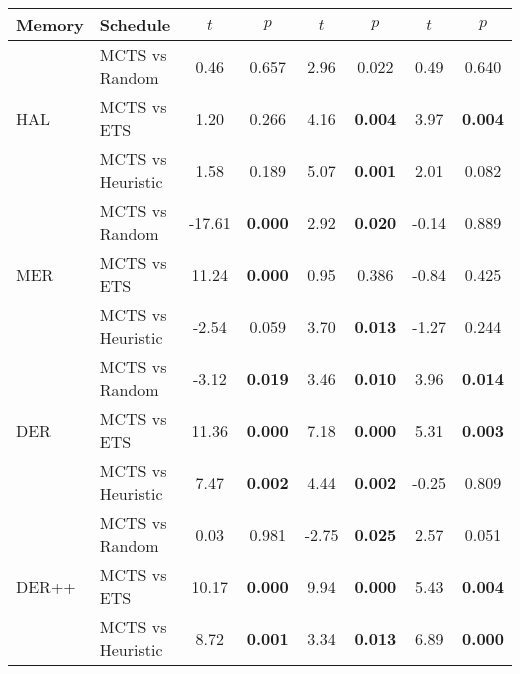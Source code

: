 \begin{tabular}{llcccccc}
\textbf{Memory}        & \textbf{Schedule} & $t$        & $p$          & $t$       & $p$          & $t$       & $p$          \\ \midrule
\multirow{3}{*}{HAL}   & MCTS vs Random    & 0.46   & 0.657 & 2.96  & 0.022 & 0.49  & 0.640 \\
                       & MCTS vs ETS       & 1.20   & 0.266 & 4.16  & \textbf{0.004} & 3.97  & \textbf{0.004} \\
                       & MCTS vs Heuristic   & 1.58   & 0.189 & 5.07  & \textbf{0.001} & 2.01  & 0.082 \\ \midrule
\multirow{3}{*}{MER}   & MCTS vs Random    & -17.61 & \textbf{0.000} & 2.92  & \textbf{0.020} & -0.14 & 0.889 \\
                       & MCTS vs ETS       & 11.24  & \textbf{0.000} & 0.95  & 0.386 & -0.84 & 0.425 \\
                       & MCTS vs Heuristic   & -2.54  & 0.059 & 3.70  & \textbf{0.013} & -1.27 & 0.244 \\ \midrule
\multirow{3}{*}{DER}   & MCTS vs Random    & -3.12  & \textbf{0.019} & 3.46  & \textbf{0.010} & 3.96  & \textbf{0.014} \\
                       & MCTS vs ETS       & 11.36  & \textbf{0.000} & 7.18  & \textbf{0.000} & 5.31  & \textbf{0.003} \\
                       & MCTS vs Heuristic   & 7.47   & \textbf{0.002} & 4.44  & \textbf{0.002} & -0.25 & 0.809 \\ \midrule
\multirow{3}{*}{DER++} & MCTS vs Random    & 0.03   & 0.981 & -2.75 & \textbf{0.025} & 2.57  & 0.051 \\
                       & MCTS vs ETS       & 10.17  & \textbf{0.000} & 9.94  & \textbf{0.000} & 5.43  & \textbf{0.004} \\
                       & MCTS vs Heuristic   & 8.72   & \textbf{0.001} & 3.34  & \textbf{0.013} & 6.89  & \textbf{0.000} \\
\bottomrule
\end{tabular}